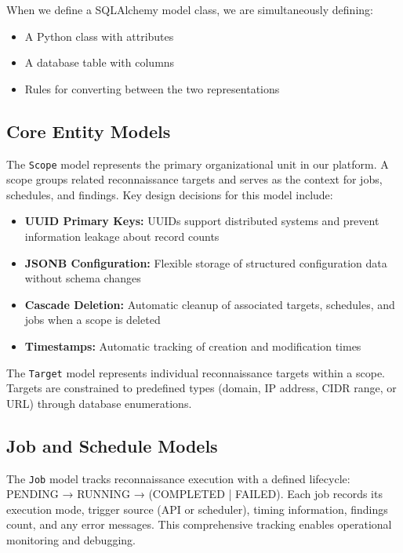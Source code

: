 \documentclass[a4paper,12pt]{report}
\begin{document}
When we define a SQLAlchemy model class, we are simultaneously defining:
\begin{itemize}
\item A Python class with attributes
\item A database table with columns
\item Rules for converting between the two representations
\end{itemize}

\subsection{Core Entity Models}

The \texttt{Scope} model represents the primary organizational unit in our platform. A scope groups related reconnaissance targets and serves as the context for jobs, schedules, and findings. Key design decisions for this model include:

\begin{itemize}
\item \textbf{UUID Primary Keys:} UUIDs support distributed systems and prevent information leakage about record counts
\item \textbf{JSONB Configuration:} Flexible storage of structured configuration data without schema changes
\item \textbf{Cascade Deletion:} Automatic cleanup of associated targets, schedules, and jobs when a scope is deleted
\item \textbf{Timestamps:} Automatic tracking of creation and modification times
\end{itemize}

The \texttt{Target} model represents individual reconnaissance targets within a scope. Targets are constrained to predefined types (domain, IP address, CIDR range, or URL) through database enumerations.\hfill \break

\subsection{Job and Schedule Models}

The \texttt{Job} model tracks reconnaissance execution with a defined lifecycle: PENDING → RUNNING → (COMPLETED | FAILED). Each job records its execution mode, trigger source (API or scheduler), timing information, findings count, and any error messages. This comprehensive tracking enables operational monitoring and debugging.\hfill \break
\end{document}
